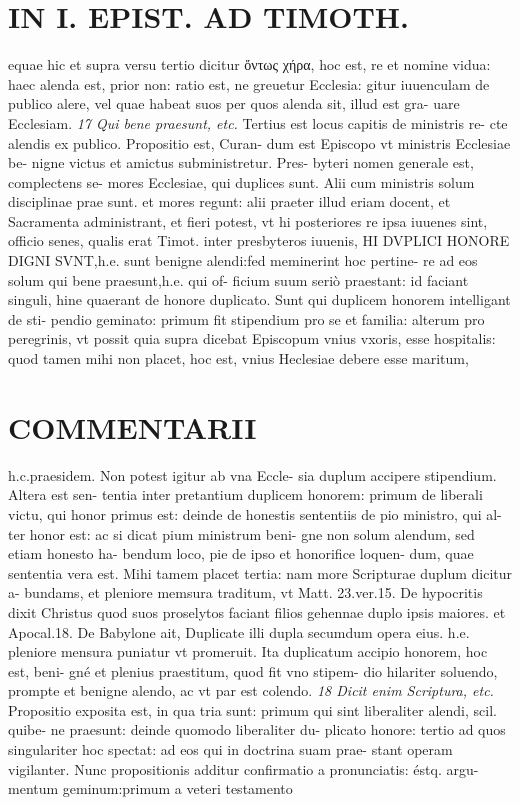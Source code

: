 \documentclass{article}
\begin{document}
\begin{pages}
\section*{IN I. EPIST. AD TIMOTH. }
\marginpar{[ p.131 ]}\pstart equae hic et supra versu tertio dicitur ὄντως χήρα, hoc est, re et nomine vidua: haec alenda est, prior non: ratio est, ne greuetur Ecclesia: gitur iuuenculam de publico alere, vel quae habeat suos per quos alenda sit, illud est gra- uare Ecclesiam.  \pend
\textit{17 Qui bene praesunt, etc. }\pstart Tertius est locus capitis de ministris re- cte alendis ex publico. Propositio est, Curan- dum est Episcopo vt ministris Ecclesiae be- nigne victus et amictus subministretur. Pres- byteri nomen generale est, complectens se- mores Ecclesiae, qui duplices sunt.  \pend\pstart Alii cum ministris solum disciplinae prae sunt. et mores regunt: alii praeter illud eriam docent, et Sacramenta administrant, et fieri potest, vt hi posteriores re ipsa iuuenes sint, officio senes, qualis erat Timot. inter presbyteros iuuenis, HI DVPLICI HONORE DIGNI SVNT,h.e. sunt benigne alendi:fed meminerint hoc pertine- re ad eos solum qui bene praesunt,h.e. qui of- ficium suum seriò praestant: id faciant singuli, hine quaerant de honore duplicato.  \pend\pstart Sunt qui duplicem honorem intelligant de sti- pendio geminato: primum fit stipendium pro se et familia: alterum pro peregrinis, vt possit quia supra dicebat Episcopum vnius vxoris, esse hospitalis: quod tamen mihi non placet, hoc est, vnius Heclesiae debere esse maritum,  \pend
\marginpar{[ p.132 ]}
\section*{COMMENTARII }\pstart h.c.praesidem. Non potest igitur ab vna Eccle- sia duplum accipere stipendium. Altera est sen- tentia inter pretantium duplicem honorem: primum de liberali victu, qui honor primus est: deinde de honestis sententiis de pio ministro, qui al- ter honor est: ac si dicat pium ministrum beni- gne non solum alendum, sed etiam honesto ha- bendum loco, pie de ipso et honorifice loquen- dum, quae sententia vera est. Mihi tamem placet tertia: nam more Scripturae duplum dicitur a- bundams, et pleniore memsura traditum, vt Matt. 23.ver.15. De hypocritis dixit Christus quod suos proselytos faciant filios gehennae duplo ipsis maiores. et Apocal.18. De Babylone ait, Duplicate illi dupla secumdum opera eius. h.e. pleniore mensura puniatur vt promeruit. Ita duplicatum accipio honorem, hoc est, beni- gné et plenius praestitum, quod fit vno stipem- dio hilariter soluendo, prompte et benigne alendo, ac vt par est colendo.  \pend
\textit{18 Dicit enim Scriptura, etc. }\pstart Propositio exposita est, in qua tria sunt: primum qui sint liberaliter alendi, scil. quibe- ne praesunt: deinde quomodo liberaliter du- plicato honore: tertio ad quos singulariter hoc spectat: ad eos qui in doctrina suam prae- stant operam vigilanter. Nunc propositionis additur confirmatio a pronunciatis: éstq. argu- mentum geminum:primum a veteri testamento  \pend

\end{pages}
\end{document}
